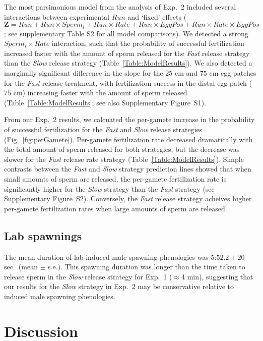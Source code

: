 \documentclass{article}
\begin{document}
	The most parsimonious model from the analysis of Exp.~2 included several interactions between experimental $Run$ and `fixed' effects ($\mathbf{Z} = Run + Run \times Sperm_i + Run \times Rate + Run \times EggPos + Run \times Rate \times EggPos$; see supplementary Table S2 for all model comparisons). We detected a strong $Sperm_i \times Rate$ interaction, such that the probability of successful fertilization increased faster with the amount of sperm released for the \textit{Fast} release strategy than the \textit{Slow} release strategy (Table~\ref{Table:ModelResults}). We also detected a marginally significant difference in the slope for the $25$ cm and $75$ cm egg patches for the \textit{Fast} release treatment, with fertilization success in the distal egg patch ($75$ cm) increasing faster with the amount of sperm released (Table~\ref{Table:ModelResults}; see also Supplementary Figure~S1).

	From our Exp.~2 results, we calcuated the per-gamete increase in the probability of successful fertilization for the \textit{Fast} and \textit{Slow} release strategies (Fig.~\ref{fig:perGamete}). Per-gamete fertilization rate decreased dramatically with the total amount of sperm released for both strategies, but the decrease was slower for the \textit{Fast} release rate strategy (Table~\ref{Table:ModelResults}). Simple contrasts between the \textit{Fast} and \textit{Slow} strategy prediction lines showed that when small amounts of sperm are released, the per-gamete fertilization rate is significantly higher for the \textit{Slow} strategy than the \textit{Fast} strategy (see Supplementary Figure~S2). Conversely, the \textit{Fast} release strategy acheives higher per-gamete fertilization rates when large amounts of sperm are released.

	\subsection*{Lab spawnings}

	The mean duration of lab-induced male spawning phenologies was $5$:$52.2 \pm 20$ sec.~(mean $\pm$ s.e.). This spawning duration was longer than the time taken to release sperm in the \textit{Slow} release strategy for Exp.~1 ($\approx$4 min), suggesting that our results for the \textit{Slow} strategy in Exp.~2 may be conservative relative to induced male spawning phenologies.


\section*{Discussion}
\end{document}
